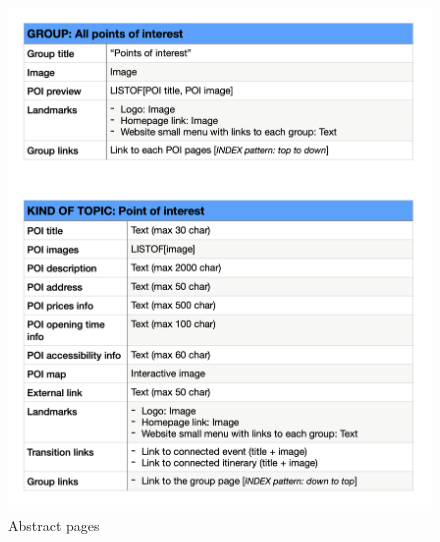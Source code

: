 \documentclass[table, 12pt]{article}
\begin{document}
\begin{figure}[H]
    \begin{center}
        \includegraphics[width=\textwidth]{assets/Tables/Abstract/abstractPage2.png}
        \caption{Abstract pages}
    \end{center}
\end{figure}
\end{document}
